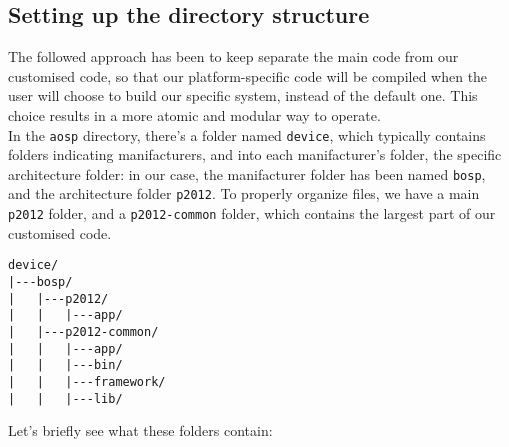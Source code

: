 \subsection{Setting up the directory structure}
The followed approach has been to keep separate the main code from our customised code, so that our platform-specific code will be compiled when the user will choose to build our specific system, instead of the default one. This choice results in a more atomic and modular way to operate.\\
In the \texttt{aosp} directory, there's a folder named \texttt{device}, which typically contains folders indicating manifacturers, and into each manifacturer's folder, the specific architecture folder: in our case, the manifacturer folder has been named \texttt{bosp}, and the architecture folder \texttt{p2012}. To properly organize files, we have a main \texttt{p2012} folder, and a \texttt{p2012-common} folder, which contains the largest part of our customised code.
\begin{verbatim}
device/
|---bosp/
|   |---p2012/
|   |   |---app/
|   |---p2012-common/
|   |   |---app/
|   |   |---bin/
|   |   |---framework/
|   |   |---lib/
\end{verbatim}
Let's briefly see what these folders contain:
